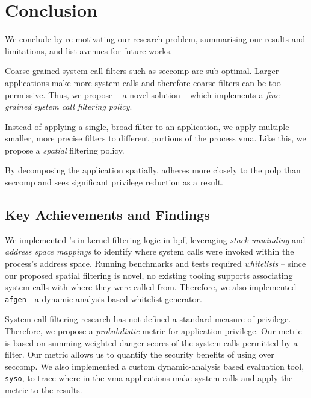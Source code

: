 \section{Conclusion}


\iffalse

\fi


We conclude by re-motivating our research problem, summarising our results and
limitations, and list avenues for future works.

Coarse-grained system call filters such as seccomp are sub-optimal.
Larger applications make more system calls and therefore coarse filters can be
too permissive. Thus, we propose \af -- a novel solution -- which implements a 
\textit{fine grained system call filtering policy}.

Instead of applying a single, broad filter to an application, we apply multiple
smaller, more precise filters to different portions of the process \ac{vma}.
Like this, we propose a \textit{spatial} filtering policy. 

By decomposing the application spatially, \af adheres more closely to the
\ac{polp} than seccomp and sees significant privilege reduction as a result.

\subsection{Key Achievements and Findings}

We implemented \af's in-kernel filtering logic in \ac{bpf}, leveraging
\textit{stack unwinding} and \textit{address space mappings} to identify where
system calls were invoked within the process's address space. Running benchmarks
and tests required \textit{whitelists} -- since our proposed spatial filtering
is novel, no existing tooling supports associating system calls with where they
were called from. Therefore, we also implemented \texttt{afgen} - a
dynamic analysis based whitelist generator.

System call filtering research has not defined a standard measure of privilege.
Therefore, we propose a \textit{probabilistic} metric for application privilege.
Our metric is based on summing weighted danger scores of the system calls
permitted by a filter. Our metric allows us to quantify the security benefits
of using \af over seccomp. We also implemented a custom dynamic-analysis based
evaluation tool, \texttt{syso}, to trace where in the \ac{vma} applications make 
system calls and apply the metric to the results.

